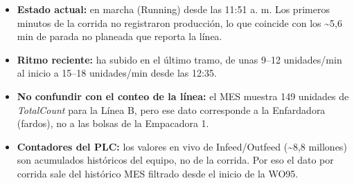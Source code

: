 \begin{singlespace}
{\begin{itemize}[leftmargin=1.2em,itemsep=0pt,topsep=2pt]
\item \textbf{Estado actual:} en marcha (Running) desde las 11:51 a. m. Los primeros minutos de la corrida no registraron producción, lo que coincide con los \textasciitilde{}5,6 min de parada no planeada que reporta la línea.
\item \textbf{Ritmo reciente:} ha subido en el último tramo, de unas 9–12 unidades/min al inicio a 15–18 unidades/min desde las 12:35.
\item \textbf{No confundir con el conteo de la línea:} el MES muestra 149 unidades de \textit{TotalCount} para la Línea B, pero ese dato corresponde a la Enfardadora (fardos), no a las bolsas de la Empacadora 1.
\item \textbf{Contadores del PLC:} los valores en vivo de Infeed/Outfeed (\textasciitilde{}8,8 millones) son acumulados históricos del equipo, no de la corrida. Por eso el dato por corrida sale del histórico MES filtrado desde el inicio de la WO95.
\end{itemize}}

\end{singlespace}
